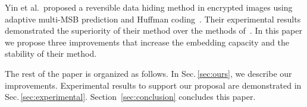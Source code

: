 Yin et al.\ proposed a reversible data hiding method in encrypted images using adaptive multi-MSB prediction and Huffman coding~\cite{Yin2020}.
Their experimental results demonstrated the superiority of their method over the methods of~\cite{Puteaux2018, Chen2019, Puyang2019, Puteaux2019, Yi2019}.
In this paper
we propose three improvements that increase the embedding capacity and the stability of their method.

The rest of the paper is organized as follows. 
In Sec.\,\ref{sec:ours}, we describe our improvements.
Experimental results to support our proposal are demonstrated in Sec.\,\ref{sec:experimental}.
Section~\ref{sec:conclusion} concludes this paper. 